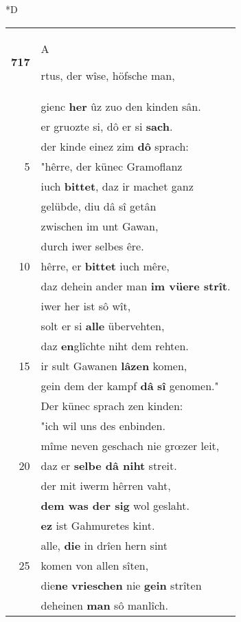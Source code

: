 \documentclass[8pt,a4paper,notitlepage]{article}
\begin{document}
\begin{table}[ht]
\begin{minipage}[t]{0.5\linewidth}
\small
\begin{center}*D
\end{center}
\begin{tabular}{rl}
\textbf{717} & \begin{large}A\end{large}rtus, der wîse, höfsche man,\\ 
 & gienc \textbf{her} ûz zuo den kinden sân.\\ 
 & er gruozte si, dô er si \textbf{sach}.\\ 
 & der kinde einez zim \textbf{dô} sprach:\\ 
5 & "hêrre, der künec Gramoflanz\\ 
 & iuch \textbf{bittet}, daz ir machet ganz\\ 
 & gelübde, diu dâ sî getân\\ 
 & zwischen im unt Gawan,\\ 
 & durch iwer selbes êre.\\ 
10 & hêrre, er \textbf{bittet} iuch mêre,\\ 
 & daz dehein ander man \textbf{im vüere strît}.\\ 
 & iwer her ist sô wît,\\ 
 & solt er si \textbf{alle} übervehten,\\ 
 & daz \textbf{en}glîchte niht dem rehten.\\ 
15 & ir sult Gawanen \textbf{lâzen} komen,\\ 
 & gein dem der kampf \textbf{dâ} \textbf{sî} genomen."\\ 
 & Der künec sprach zen kinden:\\ 
 & "ich wil uns des enbinden.\\ 
 & mîme neven geschach nie grœzer leit,\\ 
20 & daz er \textbf{selbe dâ niht} streit.\\ 
 & der mit iwerm hêrren vaht,\\ 
 & \textbf{dem was der sig} wol geslaht.\\ 
 & \textbf{ez} ist Gahmuretes kint.\\ 
 & alle, \textbf{die} in drîen hern sint\\ 
25 & komen von allen sîten,\\ 
 & die\textbf{ne} \textbf{vrieschen} nie \textbf{gein} strîten\\ 
 & deheinen \textbf{man} sô manlîch.\\ 

\end{tabular}
\end{minipage}
\end{table}
\end{document}
